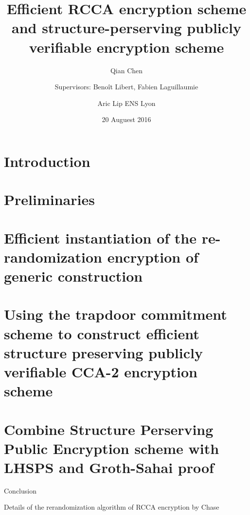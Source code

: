 \documentclass[11pt]{article}
\begin{document}
\title{Efficient RCCA encryption scheme and structure-perserving publicly verifiable encryption scheme}

\author{Qian Chen \and Supervisors: Beno\^it Libert, Fabien Laguillaumie \and Aric Lip ENS Lyon}

\date{20 Auguest 2016}

\maketitle

\thispagestyle{empty}



\section{Introduction}


\newpage

\section{Preliminaries}



\section{Efficient instantiation of the re-randomization encryption of generic construction~\cite{DBLP:conf/eurocrypt/ChaseKLM12}}


\section{Using the trapdoor commitment scheme to construct efficient structure preserving publicly verifiable CCA-2 encryption scheme}


\section{Combine Structure Perserving Public Encryption scheme with LHSPS and Groth-Sahai proof}


\begin{section}{Conclusion}
  
\end{section}

\printbibliography

\begin{appendices}
  
\begin{section}{Details of the rerandomization algorithm of RCCA encryption by Chase \etal\cite{DBLP:conf/eurocrypt/ChaseKLM12}}
  \label{Rerandomization}
  
\end{section}


\end{appendices}
\end{document}

